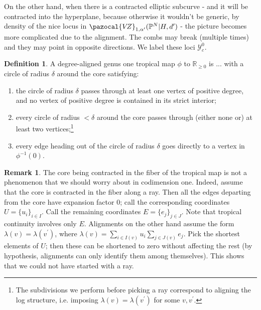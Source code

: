 \documentclass[11pt]{amsart}
\newcommand{\PP}{\mathbb P}
\newcommand{\VZ}{\pazocal{V\!Z}}
\theoremstyle{definition}
\theoremstyle{definition}
\newtheorem{dfn}[thm]{Definition}
\newtheorem{remark}[thm]{Remark}
\begin{document}
On the other hand, when there is a contracted elliptic subcurve - and it will be contracted into the hyperplane, because otherwise it wouldn't be generic, by density of the nice locus in $\VZ_{1,\alpha^\prime}(\PP^N|H,d^\prime)$ - the picture becomes more complicated due to the alignment. The combs may break (multiple times) and they may point in opposite directions. We label these loci $\mathcal{Y}_c^0$.
\begin{figure}
\end{figure}
\begin{dfn}
 A degree-aligned genus one tropical map $\phi$ to $\mathbb R_{\geq 0}$ is ... with a circle of radius $\delta$ around the core satisfying:
 \begin{enumerate}
  \item the circle of radius $\delta$ passes through at least one vertex of positive degree, and no vertex of positive degree is contained in its strict interior;
  \item every circle of radius $<\delta$ around the core passes through (either none or) at least two vertices;\footnote{The subdivisions we perform before picking a ray correspond to aligning the log structure, i.e. imposing $\lambda(v)=\lambda(v^\prime)$ for some $v,v^\prime$.}
  \item every edge heading out of the circle of radius $\delta$ goes directly to a vertex in $\phi^{-1}(0)$.
 \end{enumerate}
\end{dfn}

\begin{remark}
 The core being contracted in the fiber of the tropical map is not a phenomenon that we should worry about in codimension one. Indeed, assume that the core is contracted in the fiber along a ray. Then all the edges departing from the core have expansion factor $0$; call the corresponding coordinates $U=\{u_i\}_{i\in I}$. Call the remaining coordinates $E=\{e_j\}_{j\in J}$. Note that tropical continuity involves only $E$. Alignments on the other hand assume the form $\lambda(v)=\lambda(v^\prime)$, where $\lambda(v)=\sum_{i\in I(v)}u_i\sum_{j\in J(v)}e_j$. Pick the shortest elements of $U$; then these can be shortened to zero without affecting the rest (by hypothesis, alignments can only identify them among themselves). This shows that we could not have started with a ray.
\end{remark}
\end{document}

